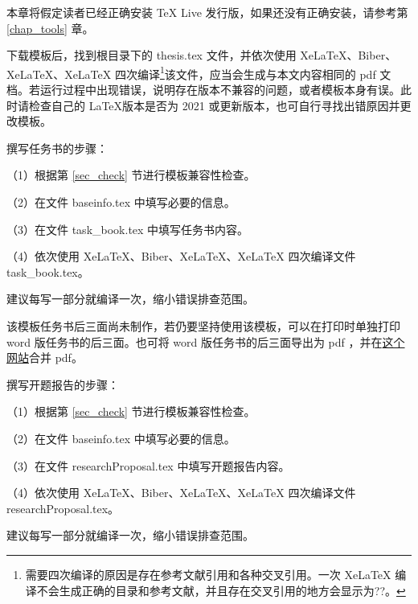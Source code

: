 \newcommand{\filename}[1]{\colorbox[RGB]{222,222,222}{\mbox{#1}}}
\newcommand{\hltext}[1]{\colorbox[RGB]{237,250,0}{#1}}  %

\label{chap:模板使用说明}
本章将假定读者已经正确安装 \TeX{} Live 发行版，如果还没有正确安装，请参考第 \ref{chap_tools} 章。

\label{sec_check}  %
下载模板后，找到根目录下的 \filename{thesis.tex} 文件，并依次使用 XeLaTeX、Biber、XeLaTeX、XeLaTeX 四次编译\footnote{需要四次编译的原因是存在参考文献引用和各种交叉引用。一次 XeLaTeX 编译不会生成正确的目录和参考文献，并且存在交叉引用的地方会显示为??。}该文件，应当会生成与本文内容相同的 pdf 文档。若运行过程中出现错误，说明存在版本不兼容的问题，或者模板本身有误。此时请检查自己的 \LaTeX 版本是否为 2021 或更新版本，也可自行寻找出错原因并更改模板。


撰写任务书的步骤：

  （1）根据第 \ref{sec_check} 节进行模板兼容性检查。

  （2）在文件 \filename{baseinfo.tex} 中填写必要的信息。

  （3）在文件 \filename{task\_book.tex} 中填写任务书内容。

  （4）依次使用 XeLaTeX、Biber、XeLaTeX、XeLaTeX 四次编译文件 \filename{task\_book.tex}。

建议每写一部分就编译一次，缩小错误排查范围。

\hltext{该模板任务书后三面尚未制作}，若仍要坚持使用该模板，可以在打印时单独打印 word 版任务书的后三面。也可将  word 版任务书的后三面导出为 pdf ，并在\href{https://www.ilovepdf.com/zh-cn/merge_pdf}{这个网站}合并 pdf。


撰写开题报告的步骤：

（1）根据第 \ref{sec_check} 节进行模板兼容性检查。

（2）在文件 \filename{baseinfo.tex} 中填写必要的信息。

（3）在文件 \filename{researchProposal.tex} 中填写开题报告内容。

（4）依次使用 XeLaTeX、Biber、XeLaTeX、XeLaTeX 四次编译文件 \filename{researchProposal.tex}。

建议每写一部分就编译一次，缩小错误排查范围。


